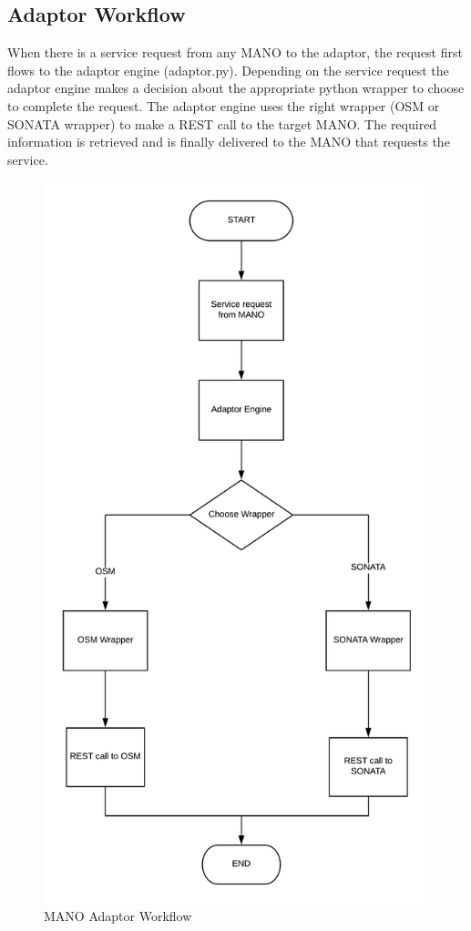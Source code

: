 \subsection{Adaptor Workflow}
When there is a service request from any MANO to the adaptor, the request first flows to the adaptor engine (adaptor.py). Depending on the service request the adaptor engine makes a decision about the appropriate python wrapper to choose to complete the request. The adaptor engine uses the right wrapper (OSM or SONATA wrapper) to make a REST call to the target MANO. The required information is  retrieved and is finally delivered to the MANO that requests the service.
\begin{figure}[H]
	\centering
	\includegraphics[width=0.7\linewidth]{figures/MA_Workflow}
	\caption{MANO Adaptor Workflow}
	\label{fig:maworkflow}
\end{figure}


